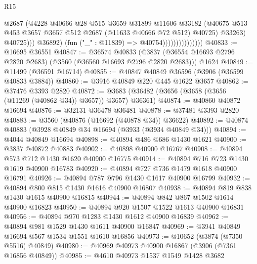 \begin{lexlean}{R15}
\begin{coremodule}
                                        @2687
                                        (@4228
                                          @40666
                                          @28
                                          @515
                                          @3659
                                          @31899
                                          @11606
                                          @33182
                                          (@40675
                                            @513
                                            @453
                                            @3657
                                            @3657
                                            @512
                                            @2687
                                            (@11633 @40666 @72 @512)
                                            @40725)
                                          @33263)
                                        @40725)))
                                  @36892)
                                (fun ("_" : @11839) => @40754)))))))))))))))
@40833 := @16695 @36551
@40847 := @36574
    @40833
    (@3837 (@36554 @16693 @2796 @2820 @2683) (@3560 (@36560 @16693 @2796 @2820 @2683)))
    @1624
@40849 := @11499 (@36591 @16714)
@40855 := @40847 @40849 @36596 (@3906 (@36599 @40833 @3884))
@40860 := @3916 @40849 @220 @445 @1622 @3657
@40862 := @37476 @3393 @2820
@40872 := @3683 (@36482 (@3656 (@3658 (@3656 (@11269 (@40862 @34)) @3657)) @3657) @36361)
@40874 := @40860 @40872 @16694
@40876 := @32131 @36478 @36481
@40878 := @37481 @3393 @2820
@40883 := @3560 (@40876 (@16692 (@40878 @34)) @36622)
@40892 := @40874 @40883 (@3928 @40849 @34 @16694 (@3933 (@3934 @40849 @34)))
@40894 := @4044 @40849 @16694
@40898 := @40894 @486 @686 @1430 @1621
@40900 := @3837 @40872 @40883
@40902 := @40898 @40900 @16767
@40908 := @40894 @573 @712 @1430 @1620 @40900 @16775
@40914 := @40894 @716 @723 @1430 @1619 @40900 @16783
@40920 := @40894 @727 @736 @1479 @1618 @40900 @16791
@40926 := @40894 @787 @796 @1430 @1617 @40900 @16799
@40932 := @40894 @800 @815 @1430 @1616 @40900 @16807
@40938 := @40894 @819 @838 @1430 @1615 @40900 @16815
@40944 := @40894 @842 @867 @1502 @1614 @40900 @16823
@40950 := @40894 @920 @1507 @1522 @1613 @40900 @16831
@40956 := @40894 @970 @1283 @1430 @1612 @40900 @16839
@40962 := @40894 @981 @1529 @1430 @1611 @40900 @16847
@40969 := @3941 @40849 @16694 @567 @1534 @1551 @1610 @16856
@40973 := @10652 (@3874 (@7350 @5516) @40849)
@40980 := @40969 @40973 @40900 @16867 (@3906 (@7361 @16856 @40849))
@40985 := @4610 @40973 @1537 @1549 @1428 @3682

\end{coremodule}
\end{lexlean}
